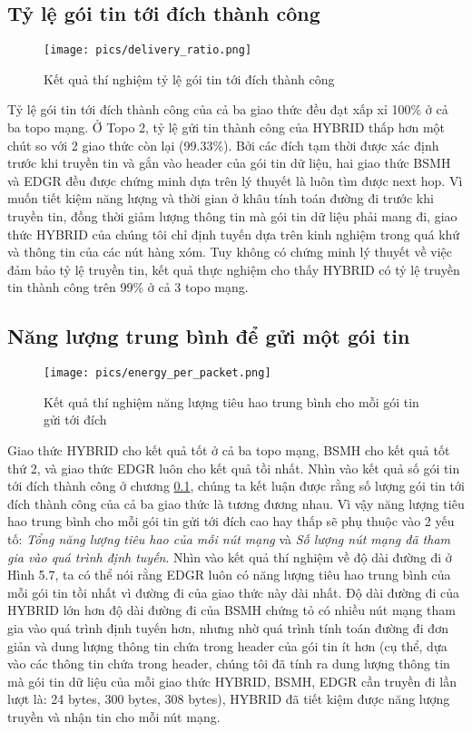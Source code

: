 \documentclass[12pt]{report}
\begin{document}
\subsection{Tỷ lệ gói tin tới đích thành công}
\label{sec:5.3.3}
\begin{figure}[H]
\centering
\texttt{[image: pics/delivery\_ratio.png]}
\caption{Kết quả thí nghiệm tỷ lệ gói tin tới đích thành công}
\end{figure}
Tỷ lệ gói tin tới đích thành công của cả ba giao thức đều đạt xấp xỉ 100\% ở cả ba topo mạng. Ở Topo 2, tỷ lệ gửi tin thành công của HYBRID thấp hơn một chút so với 2 giao thức còn lại (99.33\%). Bởi các đích tạm thời được xác định trước khi truyền tin và gắn vào header của gói tin dữ liệu, hai giao thức BSMH và EDGR đều được chứng minh dựa trên lý thuyết là luôn tìm được next hop. Vì muốn tiết kiệm năng lượng và thời gian ở khâu tính toán đường đi trước khi truyền tin, đồng thời giảm lượng thông tin mà gói tin dữ liệu phải mang đi, giao thức HYBRID của chúng tôi chỉ định tuyến dựa trên kinh nghiệm trong quá khứ và thông tin của các nút hàng xóm. Tuy không có chứng minh lý thuyết về việc đảm bảo tỷ lệ truyền tin, kết quả thực nghiệm cho thấy HYBRID có tỷ lệ truyền tin thành công trên 99\% ở cả 3 topo mạng.
\subsection{Năng lượng trung bình để gửi một gói tin}
\begin{figure}[H]
\centering
\texttt{[image: pics/energy\_per\_packet.png]}
\caption{Kết quả thí nghiệm năng lượng tiêu hao trung bình cho mỗi gói tin gửi tới đích}
\end{figure}
Giao thức HYBRID cho kết quả tốt ở cả ba topo mạng, BSMH cho kết quả tốt thứ 2, và giao thức EDGR luôn cho kết quả tồi nhất. Nhìn vào kết quả số gói tin tới đích thành công ở chương \ref{sec:5.3.3}, chúng ta kết luận được rằng số lượng gói tin tới đích thành công của cả ba giao thức là tương đương nhau. Vì vậy năng lượng tiêu hao trung bình cho mỗi gói tin gửi tới đích cao hay thấp sẽ phụ thuộc vào 2 yếu tố: \textit{Tổng năng lượng tiêu hao của mỗi nút mạng} và \textit{Số lượng nút mạng đã tham gia vào quá trình định tuyến}. Nhìn vào kết quả thí nghiệm về độ dài đường đi ở Hình 5.7, ta có thể nói rằng EDGR luôn có năng lượng tiêu hao trung bình của mỗi gói tin tồi nhất vì đường đi của giao thức này dài nhất. Độ dài đường đi của HYBRID lớn hơn độ dài đường đi của BSMH chứng tỏ có nhiều nút mạng tham gia vào quá trình định tuyến hơn, nhưng nhờ quá trình tính toán đường đi đơn giản và dung lượng thông tin chứa trong header của gói tin ít hơn (cụ thể, dựa vào các thông tin chứa trong header, chúng tôi đã tính ra dung lượng thông tin mà gói tin dữ liệu của mỗi giao thức HYBRID, BSMH, EDGR cần truyền đi lần lượt là: 24 bytes, 300 bytes, 308 bytes), HYBRID đã tiết kiệm được năng lượng truyền và nhận tin cho mỗi nút mạng. 
\end{document}
